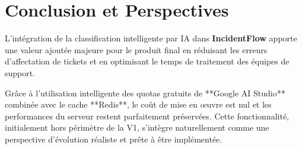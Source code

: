 \documentclass[12pt,a4paper]{article}
\begin{document}
\section{Conclusion et Perspectives}
L'intégration de la classification intelligente par IA dans \textbf{IncidentFlow} apporte une valeur ajoutée majeure pour le produit final en réduisant les erreurs d'affectation de tickets et en optimisant le temps de traitement des équipes de support. 

Grâce à l'utilisation intelligente des quotas gratuits de **Google AI Studio** combinée avec le cache **Redis**, le coût de mise en œuvre est nul et les performances du serveur restent parfaitement préservées. Cette fonctionnalité, initialement hors périmètre de la V1, s'intègre naturellement comme une perspective d'évolution réaliste et prête à être implémentée.
\end{document}
